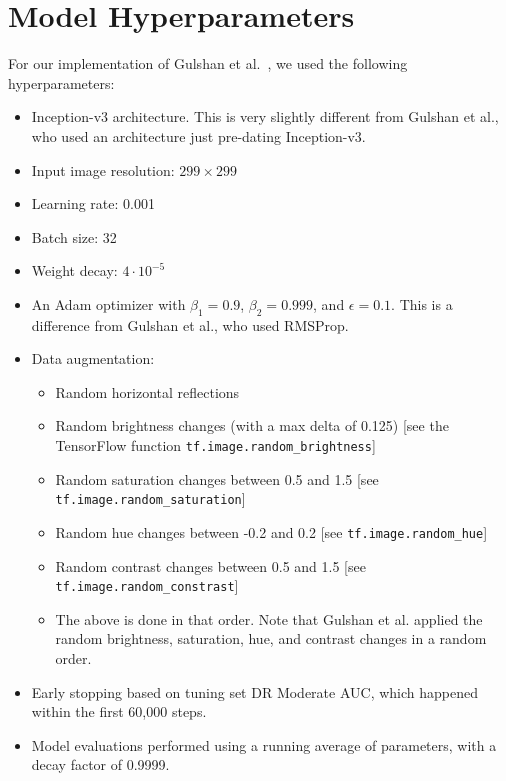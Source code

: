 \documentclass{llncs}
\begin{document}
\section{Model Hyperparameters}
\label{sec:hyperparameters}
For our implementation of Gulshan et al.~\cite{gulshan2016development}, we used the following hyperparameters:
\begin{itemize}
  \item Inception-v3 architecture. This is very slightly different from Gulshan et al., who used an architecture just pre-dating Inception-v3.
  \item Input image resolution: $299 \times 299$
  \item Learning rate: 0.001
  \item Batch size: 32
  \item Weight decay: $4 \cdot 10^{-5}$
  \item An Adam optimizer with $\beta_1 = 0.9$, $\beta_2 = 0.999$, and $\epsilon = 0.1$. This is a difference from Gulshan et al., who used RMSProp.
  \item Data augmentation:
    \begin{itemize}
      \item Random horizontal reflections
      \item Random brightness changes (with a max delta of 0.125) [see the TensorFlow function \verb|tf.image.random_brightness|]
      \item Random saturation changes between 0.5 and 1.5 [see \verb|tf.image.random_saturation|]
      \item Random hue changes between -0.2 and 0.2 [see \verb|tf.image.random_hue|]
      \item Random contrast changes between 0.5 and 1.5 [see \verb|tf.image.random_constrast|]
      \item The above is done in that order. Note that Gulshan et al. applied the random brightness, saturation, hue, and contrast changes in a random order.
    \end{itemize}
  \item Early stopping based on tuning set DR Moderate AUC, which happened within the first 60,000 steps.
  \item Model evaluations performed using a running average of parameters, with a decay factor of 0.9999.
\end{itemize}
\end{document}
